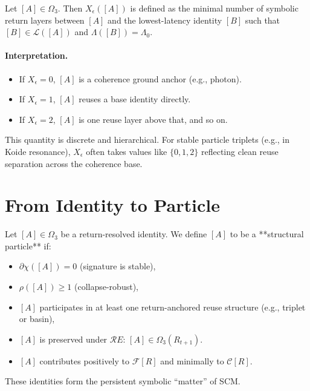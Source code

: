\begin{definition}
Let $[A] \in \Omega_3$. Then $X_\epsilon([A])$ is defined as the minimal number of symbolic return layers between $[A]$ and the lowest-latency identity $[B]$ such that $[B] \in \mathcal{L}([A])$ and $\Lambda([B]) = \Lambda_0$.
\end{definition}

\paragraph{Interpretation.}
\begin{itemize}
    \item If $X_\epsilon = 0$, $[A]$ is a coherence ground anchor (e.g., photon).
    \item If $X_\epsilon = 1$, $[A]$ reuses a base identity directly.
    \item If $X_\epsilon = 2$, $[A]$ is one reuse layer above that, and so on.
\end{itemize}

This quantity is discrete and hierarchical. For stable particle triplets (e.g., in Koide resonance), $X_\epsilon$ often takes values like $\{0,1,2\}$ reflecting clean reuse separation across the coherence base.


\section{From Identity to Particle} \label{sec:identity-to-particle}

Let $[A] \in \Omega_3$ be a return-resolved identity. We define $[A]$ to be a **structural particle** if:

\begin{itemize}
  \item $\partial\chi([A]) = 0$ (signature is stable),
  \item $\rho([A]) \geq 1$ (collapse-robust),
  \item $[A]$ participates in at least one return-anchored reuse structure (e.g., triplet or basin),
  \item $[A]$ is preserved under $\mathcal{R}E$: $[A] \in \Omega_3(R_{t+1})$.
  \item $[A]$ contributes positively to $\mathcal{F}[R]$ and minimally to $\mathcal{C}[R]$.
\end{itemize}

These identities form the persistent symbolic “matter” of SCM.

